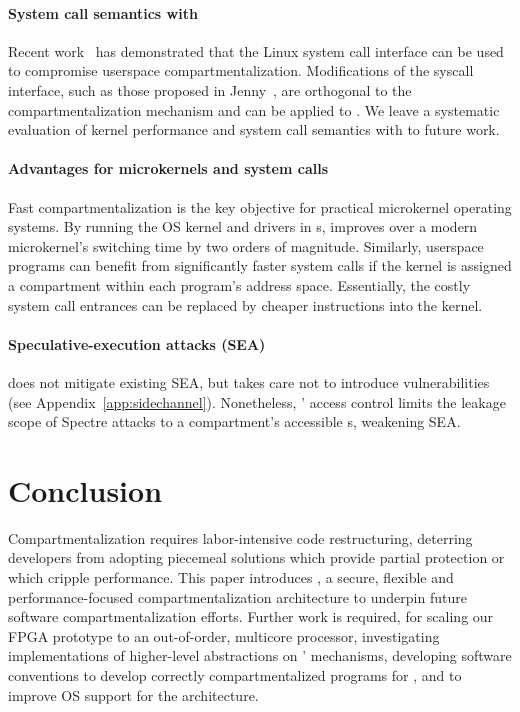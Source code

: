 \paragraph{System call semantics with \seccells}
Recent work~\cite{ConnorMSS20} has demonstrated that the Linux system call
interface can be used to compromise userspace compartmentalization.
Modifications of the syscall interface, such as those proposed in 
Jenny~\cite{schrammel2022jenny}, are orthogonal to the compartmentalization
mechanism and can be applied to \seccells.
We leave a systematic evaluation of kernel performance and 
system call semantics with \seccells to future work.

\paragraph{Advantages for microkernels and system calls}
Fast compartmentalization is the key objective for practical microkernel
operating systems.
By running the OS kernel and drivers in \secdiv{}s, \seccells improves over
a modern microkernel's switching time by two orders of magnitude.
Similarly, userspace programs can benefit from significantly faster system
calls if the kernel is assigned a compartment within each program's address
space.
Essentially, the costly system call entrances can be replaced by cheaper
\sdswitch instructions into the kernel.  

\paragraph{Speculative-execution attacks (SEA)}
\seccells does not mitigate existing SEA, but takes care
not to introduce vulnerabilities (see Appendix~\ref{app:sidechannel}).
Nonetheless, \seccells' access control limits the leakage scope of 
Spectre attacks to a compartment's accessible \cell{}s, 
weakening SEA.

\section{Conclusion}

Compartmentalization requires labor-intensive code restructuring, 
deterring developers from adopting piecemeal solutions which provide
partial protection or which cripple performance.
This paper introduces \seccells, a secure, flexible and 
performance-focused compartmentalization architecture to
underpin future software compartmentalization efforts.
Further work is required, for 
scaling our FPGA prototype to an out-of-order, multicore processor, 
investigating implementations of higher-level abstractions 
on \seccells' mechanisms,
developing software conventions to develop correctly
compartmentalized programs for \seccells, 
and to improve OS support for the architecture.

